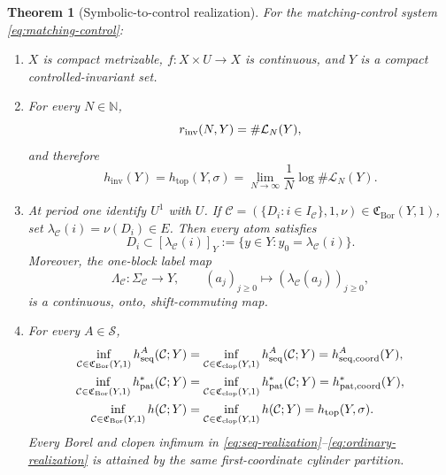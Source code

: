 \documentclass[11pt,reqno]{amsart}
\numberwithin{equation}{section}
\newtheorem{theorem}{Theorem}[section]
\theoremstyle{definition}
\newcommand{\N}{\mathbb N}
\newcommand{\C}{\mathcal C}
\newcommand{\Lcal}{\mathcal L}
\newcommand{\hseq}{h_{\mathrm{seq}}}
\newcommand{\hpat}{h_{\mathrm{pat}}^{*}}
\newcommand{\hinv}{h_{\mathrm{inv}}}
\newcommand{\htop}{h_{\mathrm{top}}}
\newcommand{\Bor}{\mathrm{Bor}}
\newcommand{\clop}{\mathrm{clop}}
\begin{document}
\begin{theorem}[Symbolic-to-control realization]\label{thm:C}
For the matching-control system \eqref{eq:matching-control}:
\begin{enumerate}
\item $X$ is compact metrizable, $f:X\times U\to X$ is continuous, and $Y$
is a compact controlled-invariant set.
\item For every $N\in\N$,
\begin{equation}\label{eq:rinv-language}
 r_{\rm inv}(N,Y)=\#\Lcal_N(Y),
\end{equation}
and therefore
\begin{equation}\label{eq:hinv-htop}
 \hinv(Y)=\htop(Y,\sigma)
 =\lim_{N\to\infty}\frac1N\log\#\Lcal_N(Y).
\end{equation}
\item At period one identify $U^1$ with $U$.  If
$\C=(\{D_i:i\in I_\C\},1,\nu)\in\mathfrak C_{\Bor}(Y,1)$, set
$\lambda_\C(i)=\nu(D_i)\in E$.  Then every atom satisfies
\begin{equation}\label{eq:atom-cylinder}
 D_i\subset[\lambda_\C(i)]_Y
 :=\{y\in Y:y_0=\lambda_\C(i)\}.
\end{equation}
Moreover, the one-block label map
\begin{equation}\label{eq:label-factor}
 \Lambda_\C:\Sigma_\C\longrightarrow Y,
 \qquad (a_j)_{j\ge0}\longmapsto(\lambda_\C(a_j))_{j\ge0},
\end{equation}
is a continuous, onto, shift-commuting map.
\item For every $A\in\mathscr S$,
\begin{align}
 \inf_{\C\in\mathfrak C_{\Bor}(Y,1)}\hseq^A(\C;Y)
 &=\inf_{\C\in\mathfrak C_{\clop}(Y,1)}\hseq^A(\C;Y)
 =h_{\rm seq,coord}^A(Y),
 \label{eq:seq-realization}\\
 \inf_{\C\in\mathfrak C_{\Bor}(Y,1)}\hpat(\C;Y)
 &=\inf_{\C\in\mathfrak C_{\clop}(Y,1)}\hpat(\C;Y)
 =h_{\rm pat,coord}^*(Y),
 \label{eq:pat-realization}\\
 \inf_{\C\in\mathfrak C_{\Bor}(Y,1)}h(\C;Y)
 &=\inf_{\C\in\mathfrak C_{\clop}(Y,1)}h(\C;Y)
 =\htop(Y,\sigma).
 \label{eq:ordinary-realization}
\end{align}
Every Borel and clopen infimum in
\eqref{eq:seq-realization}--\eqref{eq:ordinary-realization} is attained by
the same first-coordinate cylinder partition.
\end{enumerate}
\end{theorem}
\end{document}

